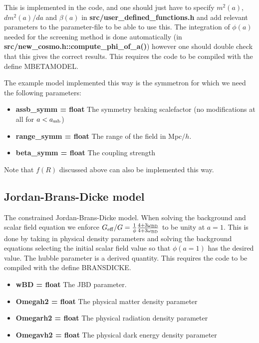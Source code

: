 \documentclass[usenatbib]{article}
\begin{document}
This is implemented in the code, and one should just have to specify $m^2(a)$, $dm^2(a)/da$ and $\beta(a)$ in \textbf{src/user\_defined\_functions.h} and add relevant parameters to the parameter-file to be able to use this. The integration of $\phi(a)$ needed for the screening method is done automatically (in \textbf{src/new\_cosmo.h::compute\_phi\_of\_a()}) however one should double check that this gives the correct results. This requires the code to be compiled with the define MBETAMODEL.

The example model implemented this way is the symmetron for which we need the following parameters:
\begin{itemize}

\item \textbf{assb\_symm = float} The symmetry braking scalefactor (no modifications at all for $a<a_{\rm ssb}$)
\item \textbf{range\_symm = float} The range of the field in Mpc$/h$.
\item \textbf{beta\_symm = float} The coupling strength

\end{itemize}
Note that $f(R)$ discussed above can also be implemented this way.

\subsection*{Jordan-Brans-Dicke model}

The constrained Jordan-Brans-Dicke model. When solving the background and scalar field equation we enforce $G_{\rm eff}/G = \frac{1}{\phi} \frac{4+3\omega_{\rm BD}}{4+3\omega_{\rm BD}}$ to be unity at $a=1$. This is done by taking in physical density parameters and solving the background equations selecting the initial scalar field value so that $\phi(a=1)$ has the desired value. The hubble parameter is a derived quantity. This requires the code to be compiled with the define BRANSDICKE.

\begin{itemize}

\item \textbf{wBD = float} The JBD parameter.
\item \textbf{Omegah2 = float} The physical matter density parameter
\item \textbf{Omegarh2 = float} The physical radiation density parameter
\item \textbf{Omegavh2 = float} The physical dark energy density parameter

\end{itemize}
\end{document}
